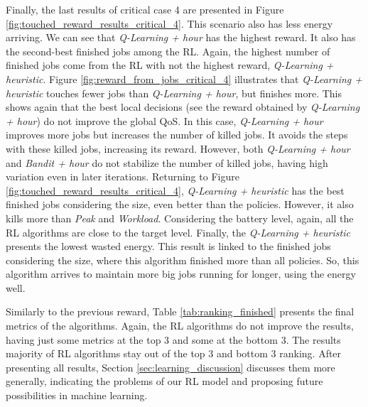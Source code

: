Finally, the last results of critical case 4 are presented in Figure \ref{fig:touched_reward_results_critical_4}. This scenario also has less energy arriving. We can see that \emph{Q-Learning + hour} has the highest reward. It also has the second-best finished jobs among the RL. Again, the highest number of finished jobs come from the RL with not the highest reward, \emph{Q-Learning + heuristic}. Figure \ref{fig:reward_from_jobs_critical_4} illustrates that \emph{Q-Learning + heuristic} touches fewer jobs than \emph{Q-Learning + hour}, but finishes more. This shows again that the best local decisions (see the reward obtained by \emph{Q-Learning + hour}) do not improve the global QoS. In this case, \emph{Q-Learning + hour} improves more jobs but increases the number of killed jobs. It avoids the steps with these killed jobs, increasing its reward. However, both \emph{Q-Learning + hour} and \emph{Bandit + hour} do not stabilize the number of killed jobs, having high variation even in later iterations. Returning to Figure \ref{fig:touched_reward_results_critical_4}, \emph{Q-Learning + heuristic} has the best finished jobs considering the size, even better than the policies. However, it also kills more than \emph{Peak} and \emph{Workload}. Considering the battery level, again, all the RL algorithms are close to the target level. Finally, the \emph{Q-Learning + heuristic} presents the lowest wasted energy. This result is linked to the finished jobs considering the size, where this algorithm finished more than all policies. So, this algorithm arrives to maintain more big jobs running for longer, using the energy well.

Similarly to the previous reward, Table \ref{tab:ranking_finished} presents the final metrics of the algorithms. Again, the RL algorithms do not improve the results, having just some metrics at the top 3 and some at the bottom 3. The results majority of RL algorithms stay out of the top 3 and bottom 3 ranking. After presenting all results, Section \ref{sec:learning_discussion} discusses them more generally, indicating the problems of our RL model and proposing future possibilities in machine learning.



\clearpage




